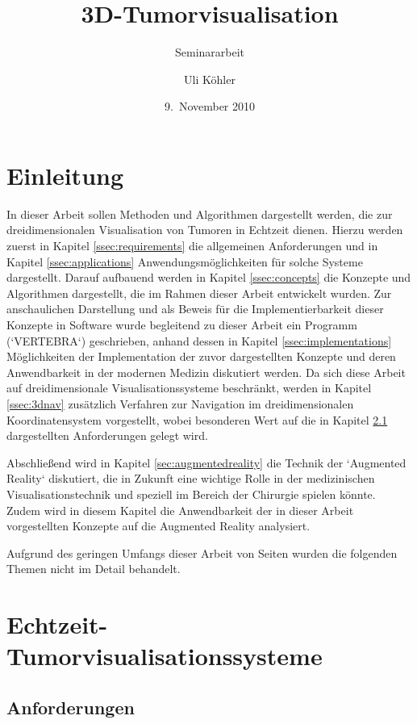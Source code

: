 \documentclass[a4paper,titlepage,12pt]{scrartcl}
\title{3D-Tumorvisualisation}
\subtitle{Seminararbeit}
\author{Uli Köhler}
\date{9.~November 2010}
\begin{document}
\maketitle\thispagestyle{empty}\newpage
\tableofcontents\thispagestyle{empty}\newpage
\section{Einleitung}\label{sec:introduction}
In dieser Arbeit sollen Methoden und Algorithmen dargestellt werden, die zur dreidimensionalen Visualisation von Tumoren in Echtzeit dienen. Hierzu werden zuerst in Kapitel \vref{ssec:requirements} die allgemeinen Anforderungen und in Kapitel \vref{ssec:applications}
Anwendungsmöglichkeiten für solche Systeme dargestellt. Darauf aufbauend werden in Kapitel \vref{ssec:concepts} die Konzepte und Algorithmen dargestellt, die im Rahmen dieser Arbeit entwickelt wurden. Zur anschaulichen Darstellung und als Beweis für die Implementierbarkeit dieser Konzepte in Software wurde begleitend zu dieser Arbeit ein Programm (`VERTEBRA`) geschrieben, anhand dessen in Kapitel \vref{ssec:implementations} Möglichkeiten der Implementation der zuvor dargestellten Konzepte und deren Anwendbarkeit in der modernen Medizin diskutiert werden. Da sich diese Arbeit auf dreidimensionale Visualisationssysteme beschränkt, werden in Kapitel \vref{ssec:3dnav} zusätzlich Verfahren zur Navigation im dreidimensionalen Koordinatensystem vorgestellt, wobei besonderen Wert auf die in Kapitel \ref{ssec:requirements} dargestellten Anforderungen gelegt wird.

Abschließend wird in Kapitel \vref{sec:augmentedreality} die Technik der `Augmented Reality` diskutiert, die in Zukunft eine wichtige Rolle in der medizinischen Visualisationstechnik und speziell im Bereich der Chirurgie spielen könnte. Zudem wird in diesem Kapitel die Anwendbarkeit der in dieser Arbeit vorgestellten Konzepte auf die Augmented Reality analysiert.

Aufgrund des geringen Umfangs dieser Arbeit von \pageref{appendixstart} Seiten wurden die folgenden Themen nicht im Detail behandelt.
\section{Echtzeit-Tumorvisualisationssysteme}\label{sec:vissystems}
\subsection{Anforderungen}\label{ssec:requirements}
\end{document}
